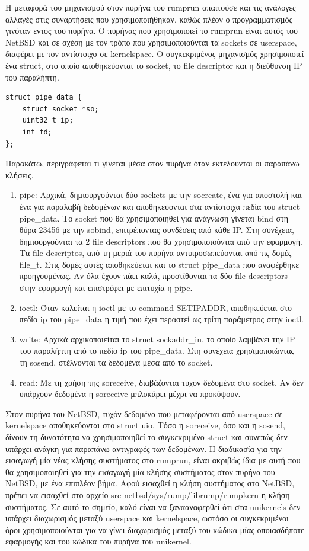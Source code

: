 Η μεταφορά του μηχανισμού στον πυρήνα του rumprun απαιτούσε και τις ανάλογες
αλλαγές στις συναρτήσεις που χρησιμοποιήθηκαν, καθώς πλέον ο προγραμματισμός
γινόταν εντός του πυρήνα. Ο πυρήνας που χρησιμοποιεί το rumprun είναι αυτός του
NetBSD και σε σχέση με τον τρόπο που χρησιμοποιούνται τα sockets σε userspace,
διαφέρει με τον αντίστοιχο σε kernelspace. Ο συγκεκριμένος μηχανισμός
χρησιμοποιεί ένα struct, στο οποίο αποθηκεύονται το socket, το file descriptor
και η διεύθυνση IP του παραλήπτη. 
\begin{lstlisting}[numbers=none,  xleftmargin=.2\textwidth, xrightmargin=.2\textwidth]
struct pipe_data {
	struct socket *so;
	uint32_t ip;
	int fd;
};
\end{lstlisting}
Παρακάτω, περιγράφεται τι γίνεται μέσα στον πυρήνα όταν εκτελούνται οι παραπάνω
κλήσεις. 
\begin{enumerate}
	\item pipe: Αρχικά, δημιουργούνται δύο sockets με την socreate, ένα για
		αποστολή και ένα για παραλαβή δεδομένων και αποθηκεύονται στα
		αντίστοιχα πεδία του struct pipe\_data. Το socket που θα
		χρησιμοποιηθεί για ανάγνωση γίνεται bind στη θύρα 23456 με την
		sobind,	επιτρέποντας συνδέσεις από κάθε IP. Στη συνέχεια,
		δημιουργούνται τα 2 file descriptors που θα χρησιμοποιούνται από
		την εφαρμογή. Τα file descriptos, από τη μεριά του πυρήνα
		αντιπροσωπεύονται από τις δομές file\_t. Στις δομές
		αυτές αποθηκεύεται και το struct pipe\_data που αναφέρθηκε
		προηγουμένως. Αν όλα έχουν πάει καλά, προστίθονται τα δύο file
		descriptors στην εφαρμογή και επιστρέφει με επιτυχία η pipe.
	\item ioctl: Όταν καλείται η ioctl με το command SETIPADDR, αποθηκεύεται
		στο πεδίο ip του pipe\_data η τιμή που έχει περαστεί ως τρίτη
		παράμετρος στην ioctl.
	\item write: Αρχικά αρχικοποιείται το struct sockaddr\_in, το οποίο
		λαμβάνει την IP του παραλήπτη από το πεδίο ip του pipe\_data.
		Στη συνέχεια χρησιμοποιώντας τη sosend, στέλνονται τα δεδομένα
		μέσα από το socket.
	\item read: Με τη χρήση της soreceive, διαβάζονται τυχόν δεδομένα στο
		socket. Αν δεν υπάρχουν δεδομένα η soreceive μπλοκάρει μέχρι να
		προκύψουν.
\end{enumerate}

Στον πυρήνα του NetBSD, τυχόν δεδομένα που μεταφέρονται από userspace σε
kernelspace αποθηκεύονται στο struct uio. Τόσο η soreceive, όσο και η sosend,
δίνουν τη δυνατότητα να χρησιμοποιηθεί το συγκεκριμένο struct και συνεπώς δεν
υπάρχει ανάγκη για παραπάνω αντιγραφές των δεδομένων. Η διαδικασία για την
εισαγωγή μία νέας κλήσης συστήματος στο rumprun, είναι ακριβώς ίδια με αυτή που
θα χρησιμοποιηθεί για την εισαγωγή μία κλήσης συστήματος στον πυρήνα του NetBSD,
με ένα επιπλέον βήμα. Αφού εισαχθεί η κλήση συστήματος στο NetBSD, πρέπει να
εισαχθεί στο αρχείο src-netbsd/sys/rump/librump/rumpkern η κλήση συστήματος.
Σε αυτό το σημείο, καλό είναι να ξανααναφερθεί ότι στα unikernels δεν υπάρχει
διαχωρισμός μεταξύ userspace και kernelspace, ωστόσο οι συγκεκριμένοι όροι
χρησιμοποιούνται για να γίνει διαχωρισμός μεταξύ του κώδικα μίας οποιασδήποτε
εφαρμογής και του κώδικα του πυρήνα του unikernel.

